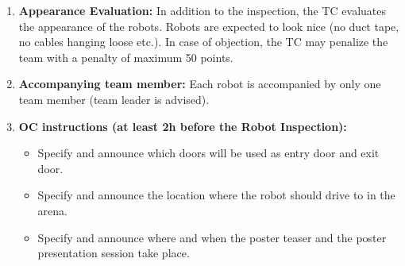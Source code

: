 \begin{enumerate}
	\item \textbf{Appearance Evaluation:} In addition to the inspection, the TC evaluates the appearance of the robots. Robots are expected to look nice (no duct tape, no cables hanging loose etc.). In case of objection, the TC may penalize the team with a penalty of maximum 50 points.
	\item \textbf{Accompanying team member:} Each robot is accompanied by only one team member (team leader is advised).
	\item \textbf{OC instructions (at least 2h before the Robot Inspection):}
	\begin{itemize}
		\item Specify and announce which doors will be used as entry door and exit door.
		\item Specify and announce the location where the robot should drive to in the arena.
		\item Specify and announce where and when the poster teaser and the poster presentation session take place.
	\end{itemize}
\end{enumerate}


